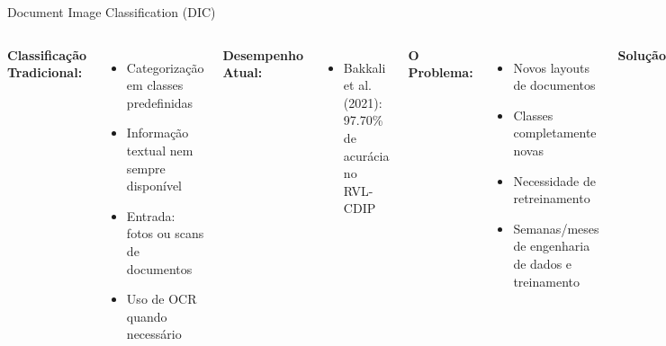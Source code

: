 \begin{frame}{Document Image Classification (DIC)}
\begin{columns}
\textbf{Classificação Tradicional:}
\begin{itemize}
    \item Categorização em classes predefinidas
    \item Informação textual nem sempre disponível
    \item Entrada: fotos ou scans de documentos
    \item Uso de OCR quando necessário
\end{itemize}

\textbf{Desempenho Atual:}
\begin{itemize}
    \item Bakkali et al. (2021): 97.70\% de acurácia no RVL-CDIP
\end{itemize}

\textbf{O Problema:}
\begin{itemize}
    \item Novos layouts de documentos
    \item Classes completamente novas
    \item Necessidade de retreinamento
    \item Semanas/meses de engenharia de dados e treinamento
\end{itemize}

\textbf{Solução:}
\begin{itemize}
    \item Técnicas de Zero-Shot Learning (ZSL)
    \item Generalização para classes não vistas
\end{itemize}
\end{columns}
\end{frame}

